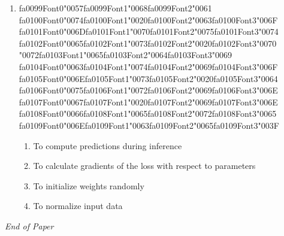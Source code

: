 \documentclass[12pt]{article}
\begin{document}
\begin{enumerate}[label=Q\arabic*.]
\item {\csname fa0099Font0\endcsname\char"0057}{\csname fa0099Font1\endcsname\char"0068}{\csname fa0099Font2\endcsname\char"0061} {\csname fa0100Font0\endcsname\char"0074}{\csname fa0100Font1\endcsname\char"0020}{\csname fa0100Font2\endcsname\char"0063}{\csname fa0100Font3\endcsname\char"006F} {\csname fa0101Font0\endcsname\char"006D}{\csname fa0101Font1\endcsname\char"0070}{\csname fa0101Font2\endcsname\char"0075}{\csname fa0101Font3\endcsname\char"0074} {\csname fa0102Font0\endcsname\char"0065}{\csname fa0102Font1\endcsname\char"0073}{\csname fa0102Font2\endcsname\char"0020}{\csname fa0102Font3\endcsname\char"0070} {\char"0072}{\csname fa0103Font1\endcsname\char"0065}{\csname fa0103Font2\endcsname\char"0064}{\csname fa0103Font3\endcsname\char"0069} {\csname fa0104Font0\endcsname\char"0063}{\csname fa0104Font1\endcsname\char"0074}{\csname fa0104Font2\endcsname\char"0069}{\csname fa0104Font3\endcsname\char"006F} {\csname fa0105Font0\endcsname\char"006E}{\csname fa0105Font1\endcsname\char"0073}{\csname fa0105Font2\endcsname\char"0020}{\csname fa0105Font3\endcsname\char"0064} {\csname fa0106Font0\endcsname\char"0075}{\csname fa0106Font1\endcsname\char"0072}{\csname fa0106Font2\endcsname\char"0069}{\csname fa0106Font3\endcsname\char"006E} {\csname fa0107Font0\endcsname\char"0067}{\csname fa0107Font1\endcsname\char"0020}{\csname fa0107Font2\endcsname\char"0069}{\csname fa0107Font3\endcsname\char"006E} {\csname fa0108Font0\endcsname\char"0066}{\csname fa0108Font1\endcsname\char"0065}{\csname fa0108Font2\endcsname\char"0072}{\csname fa0108Font3\endcsname\char"0065} {\csname fa0109Font0\endcsname\char"006E}{\csname fa0109Font1\endcsname\char"0063}{\csname fa0109Font2\endcsname\char"0065}{\csname fa0109Font3\endcsname\char"003F}
\begin{enumerate}[label=(\Alph*)]
    \item To compute predictions during inference
    \item To calculate gradients of the loss with respect to parameters
    \item To initialize weights randomly
    \item To normalize input data
\end{enumerate}
\end{enumerate}

\vfill
\noindent\textit{End of Paper}
\end{document}
